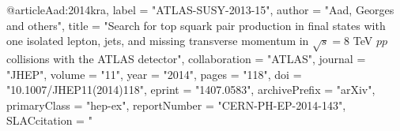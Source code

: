 @article{Aad:2014kra,
      label          = "ATLAS-SUSY-2013-15",
      author         = "Aad, Georges and others",
      title          = "{Search for top squark pair production in final states
                        with one isolated lepton, jets, and missing transverse
                        momentum in $\sqrt s =$8 TeV $pp$ collisions with the
                        ATLAS detector}",
      collaboration  = "ATLAS",
      journal        = "JHEP",
      volume         = "11",
      year           = "2014",
      pages          = "118",
      doi            = "10.1007/JHEP11(2014)118",
      eprint         = "1407.0583",
      archivePrefix  = "arXiv",
      primaryClass   = "hep-ex",
      reportNumber   = "CERN-PH-EP-2014-143",
      SLACcitation   = "%
}

